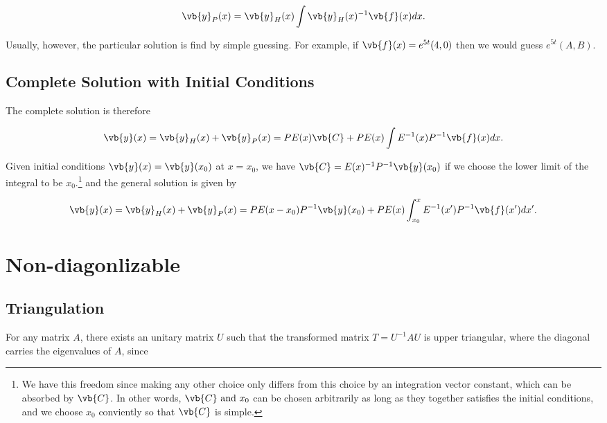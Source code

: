 \documentclass[english,a4paper,12pt]{report}
\begin{document}
\begin{equation}
    \vb{y}_{P}(x)  = \vb{y} _{H}(x) \int \vb{y} _{H} (x)^{-1} \vb{f} (x) dx .
\end{equation}

Usually, however, the particular solution is find by simple guessing. For example, if \(\vb{f} (x) = e^{5t}(4,0) \) then we would guess \(e^{5t}(A,B) \).  


\subsection{Complete Solution with Initial Conditions}

The complete solution is therefore

\begin{equation}
    \vb{y} (x) = \vb{y} _{H}(x) + \vb{y} _{P}(x) = PE(x)\vb{C} + PE (x) \int E^{-1} (x)P^{-1} \vb{f} (x)dx.  
\end{equation}

Given initial conditions \(\vb{y} (x ) = \vb{y} (x_0  )\) at \(x = x_0  \), we have \(\vb{C} =  E(x)^{-1} P^{-1} \vb{y} (x_0  )\) if we choose the lower limit of the integral to be \(x_0 \).\footnote{We have this freedom since making any other choice only differs from this choice by an integration vector constant, which can be absorbed by \(\vb{C} \). In other words, \(\vb{C} \text { and }  x_0 \) can be chosen arbitrarily as long as they together satisfies the initial conditions, and we choose \(x_0 \) conviently so that \(\vb{C} \) is simple.} and the general solution is given by 

\begin{equation}
    \vb{y} (x) = \vb{y} _{H}(x) + \vb{y} _{P}(x) = PE(x-x_0 )P^{-1} \vb{y} (x_0 ) + PE(x)\int_{x_0 }^{x} E^{-1} (x')P^{-1} \vb{f} (x')dx'.
\end{equation}



\section{Non-diagonlizable}

\subsection{Triangulation}

For any matrix \(A\), there exists an unitary matrix \(U\) such that the transformed matrix \(T = U^{-1} AU\) is upper triangular, where the diagonal carries the eigenvalues of \(A\), since 
\end{document}
